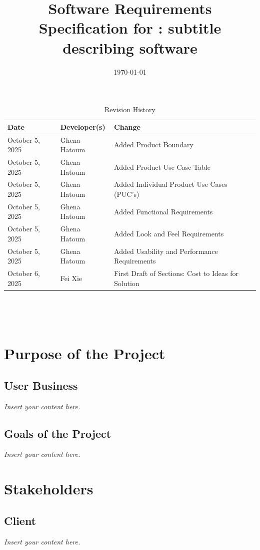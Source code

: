 \documentclass[12pt]{article}
\newcommand{\lips}{\textit{Insert your content here.}}
\begin{document}
\title{Software Requirements Specification for \progname: subtitle describing software} 
\author{\authname}
\date{\today}
	
\maketitle

\begin{table}[hp]
\caption{Revision History} \label{TblRevisionHistory}
\begin{tabularx}{\textwidth}{llX}
\toprule
\textbf{Date} & \textbf{Developer(s)} & \textbf{Change}\\
\midrule
October 5, 2025 & Ghena Hatoum & Added Product Boundary \\
October 5, 2025 & Ghena Hatoum & Added Product Use Case Table \\
October 5, 2025 & Ghena Hatoum & Added Individual Product Use Cases (PUC's) \\
October 5, 2025 & Ghena Hatoum & Added Functional Requirements \\
October 5, 2025 & Ghena Hatoum & Added Look and Feel Requirements \\
October 5, 2025 & Ghena Hatoum & Added Usability and Performance Requirements \\
October 6, 2025 & Fei Xie & First Draft of Sections: Cost to Ideas for Solution\\
\bottomrule
\end{tabularx}
\end{table}

~\newpage

\tableofcontents

~\newpage
\section{Purpose of the Project}
\subsection{User Business}
\lips
\subsection{Goals of the Project}
\lips
\section{Stakeholders}
\subsection{Client}
\lips
\end{document}
